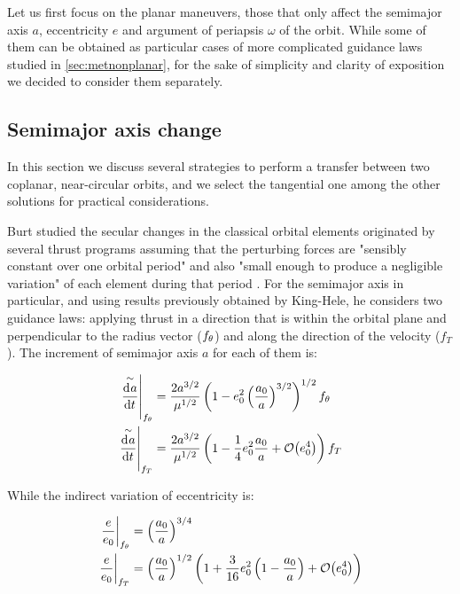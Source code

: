 Let us first focus on the planar maneuvers, those that only affect the semimajor axis $a$, eccentricity $e$ and argument of periapsis $\omega$ of the orbit. While some of them can be obtained as particular cases of more complicated guidance laws studied in \ref{sec:metnonplanar}, for the sake of simplicity and clarity of exposition we decided to consider them separately.

\subsection{Semimajor axis change} \label{sec:metsma}

In this section we discuss several strategies to perform a transfer between two coplanar, near-circular orbits, and we select the tangential one among the other solutions for practical considerations.

Burt studied the secular changes in the classical orbital elements originated by several thrust programs assuming that the perturbing forces are "sensibly constant over one orbital period" and also "small enough to produce a negligible variation" of each element during that period \cite{burt1967space}. For the semimajor axis in particular, and using results previously obtained by King-Hele, he considers two guidance laws: applying thrust in a direction that is within the orbital plane and perpendicular to the radius vector ($f_{\theta}$) and along the direction of the velocity ($f_T$). The increment of semimajor axis $a$ for each of them is:

\begin{align*}
\left. \secular{\deriv{a}{t}} \right|_{f_{\ta}} & = \frac{2 a^{3/2}}{\mu^{1/2}} \left( 1 - e_0^2 \left( \frac{a_0}{a} \right)^{3/2} \right)^{1/2} f_{\ta} \\
%
\left. \secular{\deriv{a}{t}} \right|_{f_T} & = \frac{2 a^{3/2}}{\mu^{1/2}} \left( 1 - \frac{1}{4} e_0^2 \frac{a_0}{a} + \bigO{e_0^4} \right) f_T
\end{align*}

While the indirect variation of eccentricity is:

\begin{align*}
\left. \frac{e}{e_0} \right|_{f_{\ta}} & = \left( \frac{a_0}{a} \right)^{3/4} \\
%
\left. \frac{e}{e_0} \right|_{f_T} & = \left( \frac{a_0}{a} \right)^{1/2} \left( 1 + \frac{3}{16} e_0^2 \left( 1 - \frac{a_0}{a} \right) + \bigO{e_0^4} \right) \\
\end{align*}

